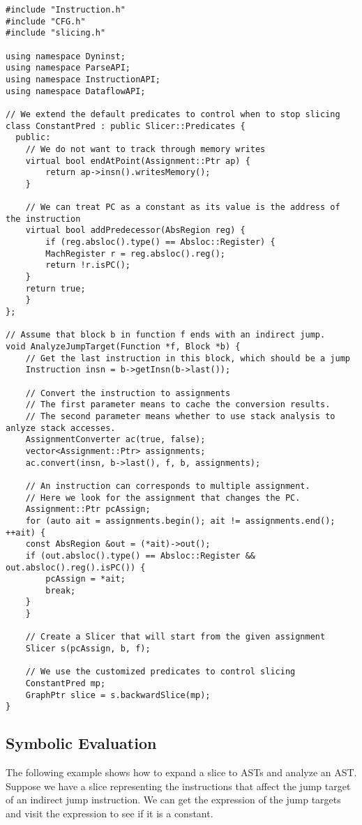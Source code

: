 \lstset{numbers=left, numberstyle=\tiny, stepnumber=5, numbersep=5pt}
\lstset{showstringspaces=false}
\begin{lstlisting}
#include "Instruction.h"
#include "CFG.h"
#include "slicing.h"

using namespace Dyninst;
using namespace ParseAPI;
using namespace InstructionAPI;
using namespace DataflowAPI;

// We extend the default predicates to control when to stop slicing
class ConstantPred : public Slicer::Predicates {
  public:
    // We do not want to track through memory writes
    virtual bool endAtPoint(Assignment::Ptr ap) {
        return ap->insn().writesMemory();
    }

    // We can treat PC as a constant as its value is the address of the instruction
    virtual bool addPredecessor(AbsRegion reg) {
        if (reg.absloc().type() == Absloc::Register) {
	    MachRegister r = reg.absloc().reg();
	    return !r.isPC();
	} 
	return true;
    }
};

// Assume that block b in function f ends with an indirect jump.
void AnalyzeJumpTarget(Function *f, Block *b) {
    // Get the last instruction in this block, which should be a jump
    Instruction insn = b->getInsn(b->last());
   
    // Convert the instruction to assignments
    // The first parameter means to cache the conversion results.
    // The second parameter means whether to use stack analysis to anlyze stack accesses.
    AssignmentConverter ac(true, false);
    vector<Assignment::Ptr> assignments;
    ac.convert(insn, b->last(), f, b, assignments);

    // An instruction can corresponds to multiple assignment.
    // Here we look for the assignment that changes the PC.
    Assignment::Ptr pcAssign;
    for (auto ait = assignments.begin(); ait != assignments.end(); ++ait) {
	const AbsRegion &out = (*ait)->out();
	if (out.absloc().type() == Absloc::Register && out.absloc().reg().isPC()) {
	    pcAssign = *ait;
	    break;
	}
    }

    // Create a Slicer that will start from the given assignment
    Slicer s(pcAssign, b, f);

    // We use the customized predicates to control slicing
    ConstantPred mp;
    GraphPtr slice = s.backwardSlice(mp);
}
\end{lstlisting}


\subsection{Symbolic Evaluation}
The following example shows how to expand a slice to ASTs and analyze an AST.
Suppose we have a slice representing the instructions that affect the jump
target of an indirect jump instruction.
We can get the expression of the jump targets and visit the expression to see if it
is a constant. 

